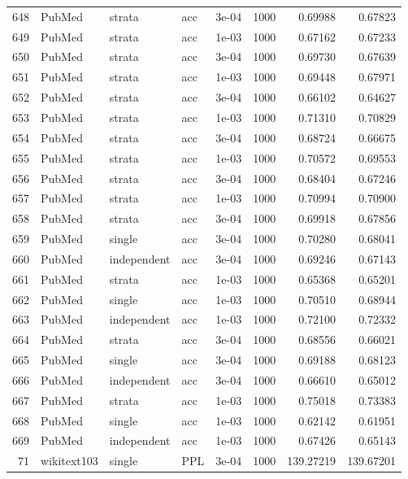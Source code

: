 \begin{longtable}{rlllrrrr}
648 & PubMed & strata & acc & 3e-04 & 1000 & 0.69988 & 0.67823 \\
\rowcolor{oursbg}
649 & PubMed & strata & acc & 1e-03 & 1000 & 0.67162 & 0.67233 \\
650 & PubMed & strata & acc & 3e-04 & 1000 & 0.69730 & 0.67639 \\
\rowcolor{oursbg}
651 & PubMed & strata & acc & 1e-03 & 1000 & 0.69448 & 0.67971 \\
652 & PubMed & strata & acc & 3e-04 & 1000 & 0.66102 & 0.64627 \\
\rowcolor{oursbg}
653 & PubMed & strata & acc & 1e-03 & 1000 & 0.71310 & 0.70829 \\
654 & PubMed & strata & acc & 3e-04 & 1000 & 0.68724 & 0.66675 \\
\rowcolor{oursbg}
655 & PubMed & strata & acc & 1e-03 & 1000 & 0.70572 & 0.69553 \\
656 & PubMed & strata & acc & 3e-04 & 1000 & 0.68404 & 0.67246 \\
\rowcolor{oursbg}
657 & PubMed & strata & acc & 1e-03 & 1000 & 0.70994 & 0.70900 \\
658 & PubMed & strata & acc & 3e-04 & 1000 & 0.69918 & 0.67856 \\
659 & PubMed & single & acc & 3e-04 & 1000 & 0.70280 & 0.68041 \\
660 & PubMed & independent & acc & 3e-04 & 1000 & 0.69246 & 0.67143 \\
\rowcolor{oursbg}
661 & PubMed & strata & acc & 1e-03 & 1000 & 0.65368 & 0.65201 \\
662 & PubMed & single & acc & 1e-03 & 1000 & 0.70510 & 0.68944 \\
663 & PubMed & independent & acc & 1e-03 & 1000 & 0.72100 & 0.72332 \\
\rowcolor{oursbg}
664 & PubMed & strata & acc & 3e-04 & 1000 & 0.68556 & 0.66021 \\
665 & PubMed & single & acc & 3e-04 & 1000 & 0.69188 & 0.68123 \\
666 & PubMed & independent & acc & 3e-04 & 1000 & 0.66610 & 0.65012 \\
\rowcolor{oursbg}
667 & PubMed & strata & acc & 1e-03 & 1000 & 0.75018 & 0.73383 \\
668 & PubMed & single & acc & 1e-03 & 1000 & 0.62142 & 0.61951 \\
669 & PubMed & independent & acc & 1e-03 & 1000 & 0.67426 & 0.65143 \\
71 & wikitext103 & single & PPL & 3e-04 & 1000 & 139.27219 & 139.67201 \\

\end{longtable}
